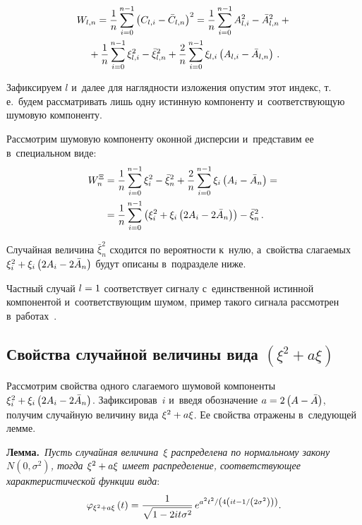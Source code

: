 \begin{multicols}{2}
\vspace*{-12pt}

\noindent
\begin{multline*}
W_{l,n}=\displaystyle\frac{\displaystyle 1\mathstrut}{\displaystyle n\mathstrut} \sum\limits_{i=0}^{n-1}\left( C_{l,i} - \bar{C}_{l,n}\right)^{2} 
=\displaystyle\frac{\displaystyle 1\mathstrut}{\displaystyle n\mathstrut} \sum\limits_{i=0}^{n-1} A_{l,i}^{2}-
\bar{A}_{l,n}^{2} +{}\\
{}+ 
\displaystyle\frac{\displaystyle 1\mathstrut}{\displaystyle n\mathstrut} \sum\limits_{i=0}^{n-1} \xi_{l,i}^{2}-\bar{\xi}_{l,n}^{2} + 
\displaystyle\frac{\displaystyle 2\mathstrut}{\displaystyle n\mathstrut} \sum\limits_{i=0}^{n-1}\xi_{l,i} \left( A_{l,i}-\bar{A}_{l,n}\right)\,.
\end{multline*}

Зафиксируем $l$ и~далее для наглядности изложения опустим 
этот индекс, т.\,е.\ будем рассматривать лишь одну истинную 
компоненту и~соответст\-ву\-ющую шумовую компоненту.

Рассмотрим шумовую компоненту оконной дисперсии и~представим ее в~специальном виде:
\begin{multline*}
W_{n}^{\Xi}= \displaystyle\frac{\displaystyle 1\mathstrut}{\displaystyle n\mathstrut} \sum\limits_{i=0}^{n-1} \xi_{i}^{2}-\bar{\xi}_{n}^{2} + 
\displaystyle\frac{\displaystyle 2\mathstrut}{\displaystyle n\mathstrut} \sum\limits_{i=0}^{n-1}\xi_{i} \left( A_{i}-\bar{A}_{n}\right) = {}\\
{}=\displaystyle\frac{\displaystyle 1\mathstrut}{\displaystyle n\mathstrut} \sum\limits_{i=0}^{n-1}\left( \xi_{i}^{2} + \xi_{i} 
\left( 2A_{i}-2\bar{A}_{n}\right)\right)  - \bar{\xi}_{n}^{2}\,.
\end{multline*}

Случайная величина $\bar{\xi}_{n}^{2}$ сходится по вероят\-ности к~нулю, а~свойства 
слагаемых
$\xi_{i}^{2} \hm+ \xi_{i} \left( 2A_{i}\hm-2\bar{A}_{n}\right)$
будут описаны в~подразделе ниже.

Частный случай $l\hm=1$ соответствует сигналу с~единственной истинной 
компонентой и~соответствующим шумом, пример такого сигнала рас\-смот\-рен 
в~работах~\cite{Z7, Khazi}.

\subsection{Свойства случайной величины вида $\left( \xi^{2} + a\xi\right)$}

Рассмотрим свойства одного слагаемого шумовой компоненты 
$ \xi_{i}^{2} \hm+ \xi_{i} \left(2 A_{i}\hm-2\bar{A}_{n}\right)$.
Зафиксировав~$i$ и~введя обозначение $a\hm = 2\left( A\hm-\bar{A}\right)$, 
получим случайную величину вида $ \xi^{2} \hm+ a\xi$. Ее 
свойства отражены в~следующей лемме.

\smallskip
    
\noindent
\textbf{Лемма.}\ \textit{Пусть случайная величина~$\xi$ распределена по нормальному 
закону $N\left( 0, \sigma^{2}\right)$, тогда  $\xi^{2}\hm +a \xi$ 
имеет распределение, соответствующее характеристической функции вида}:
 $$
 \varphi_{\xi^{2} + a\xi}\left(t \right)  = 
 \displaystyle\frac{\displaystyle 1\mathstrut}{\displaystyle \sqrt{1-2it\sigma^2}\mathstrut}\,
 e^{{a^{2}t^{2}}/\left({4\left(it - {1}/\left({2\sigma^{2}}\right)\right) }\right)}.
$$


\end{multicols}

